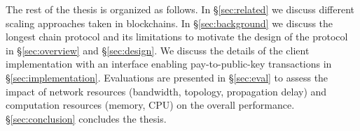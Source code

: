 
The rest of the thesis is organized as follows. In \S\ref{sec:related} we discuss different scaling approaches taken in blockchains. In \S\ref{sec:background} we discuss the longest chain protocol and its limitations to motivate the design of the \prism protocol in \S\ref{sec:overview} and \S\ref{sec:design}. We discuss the details of the client implementation with an interface enabling pay-to-public-key transactions in \S\ref{sec:implementation}. Evaluations are presented in \S\ref{sec:eval} to assess the impact of network resources (bandwidth, topology, propagation delay) and computation resources (memory, CPU) on the overall performance. \S\ref{sec:conclusion} concludes the thesis.








